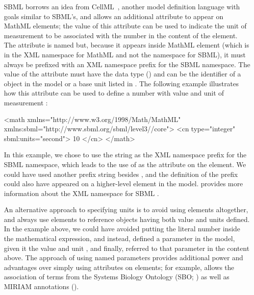 SBML borrows an idea from CellML~\citep{hedley:2001b}, another
model definition language with goals similar to SBML's, and allows
an additional attribute to appear on MathML  elements;
the value of this attribute can be used to indicate the unit of
measurement to be associated with the number in the content of the
 element.  The attribute is named  but,
because it appears inside MathML element (which is in the XML
namespace for MathML and not the namespace for SBML), it must
always be prefixed with an XML namespace prefix for the SBML
\thisLV namespace.  The value of the attribute must have the data
type  () and can
be the identifier of a \UnitDefinition object in the model or a
base unit listed in .  The following
example illustrates how this attribute can be used to define a
number with value  and unit of measurement :
\verone{\vspace*{0.25ex}}
\begin{example}
<math xmlns="http://www.w3.org/1998/Math/MathML"
      xmlns:sbml="http://www.sbml.org/sbml/level3//core">
    <cn type="integer" sbml:units="second"> 10 </cn>
</math>
\end{example} 
\verone{\vspace*{0.25ex}}

In this example, we chose to use the string  as the XML
namespace prefix for the SBML \thisLV namespace, which leads to
the use of  as the attribute on the 
element.  We could have used another prefix string besides
, and the definition of the prefix could also have
appeared on a higher-level element in the model.
 provides more information about the XML
namespace for SBML \thisLV.

An alternative approach to specifying units is to avoid using
 elements altogether, and always use  elements
to reference \Parameter objects having both value and units
defined.  In the example above, we could have avoided putting the
literal number  inside the mathematical expression, and
instead, defined a parameter in the model, given it the value
 and unit , and finally, referred to that
parameter in the  content above.  The approach of
using named parameters provides additional power and advantages
over simply using  attributes on 
elements; for example, \Parameter allows the association of terms
from the Systems Biology Ontology (SBO; ) as
well as MIRIAM annotations ().

